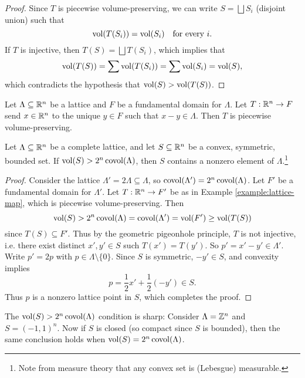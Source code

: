 \begin{proof}
  Since $T$ is piecewise volume-preserving, we can
  write $S = \bigsqcup S_i$ (disjoint union) such that
  \[
    \operatorname{vol}(T(S_i)) = \operatorname{vol}(S_i) \quad \text{for every } i.
  \]
  If $T$ is injective, then $T(S) = \bigsqcup T(S_i)$,
  which implies that
  \[\operatorname{vol}(T(S)) = \sum \operatorname{vol}(T(S_i)) = \sum \operatorname{vol}(S_i) = \operatorname{vol}(S),\]
  which contradicts the hypothesis that
  $\operatorname{vol}(S) > \operatorname{vol}(T(S))$.
\end{proof}

\begin{example}\label{example:lattice-map}
  Let $\Lambda \subseteq \mathbb{R}^n$ be a lattice and
  $F$ be a fundamental domain for $\Lambda$. Let
  $T : \mathbb{R}^n \to F$ send $x \in \mathbb{R}^n$ to the
  unique $y \in F$ such that $x - y \in \Lambda$.
  Then $T$ is piecewise volume-preserving.
\end{example}

\begin{theorem}
  Let $\Lambda \subseteq \mathbb{R}^n$ be a complete lattice,
  and let $S \subseteq \mathbb{R}^n$ be a convex, symmetric,
  bounded set. If
  $\operatorname{vol}(S) > 2^n \operatorname{covol}(\Lambda)$, then
  $S$ contains a nonzero element of $\Lambda$.\footnote{Note from measure theory that any convex set is (Lebesgue) measurable.}
\end{theorem}

\begin{proof}
  Consider the lattice $\Lambda' = 2\Lambda \subseteq \Lambda$, so
  $\operatorname{covol}(\Lambda') = 2^n \operatorname{covol}(\Lambda)$. Let
  $F'$ be a fundamental domain for $\Lambda'$. Let
  $T : \mathbb{R}^n \to F'$ be as in Example \ref{example:lattice-map},
  which is piecewise volume-preserving. Then
  \[
    \operatorname{vol}(S) > 2^n \operatorname{covol}(\Lambda) = \operatorname{covol}(\Lambda')
    = \operatorname{vol}(F') \ge \operatorname{vol}(T(S))
  \]
  since $T(S) \subseteq F'$. Thus by the geometric
  pigeonhole principle, $T$ is not injective, i.e.
  there exist distinct
  $x', y' \in S$ such $T(x') = T(y')$.
  So $p' = x' - y' \in \Lambda'$. Write $p' = 2p$
  with $p \in \Lambda \setminus \{0\}$. Since
  $S$ is symmetric, $-y' \in S$, and convexity implies
  \[
    p = \frac{1}{2}x' + \frac{1}{2}(-y') \in S.
  \]
  Thus $p$ is a nonzero lattice point in $S$, which
  completes the proof.
\end{proof}

\begin{remark}
  The $\operatorname{vol}(S) > 2^n \operatorname{covol}(\Lambda)$ condition is
  sharp: Consider $\Lambda = \mathbb{Z}^n$ and
  $S = (-1, 1)^n$. Now if $S$ is closed (so compact since
  $S$ is bounded), then the same conclusion holds
  when $\operatorname{vol}(S) = 2^n \operatorname{covol}(\Lambda)$.
\end{remark}

